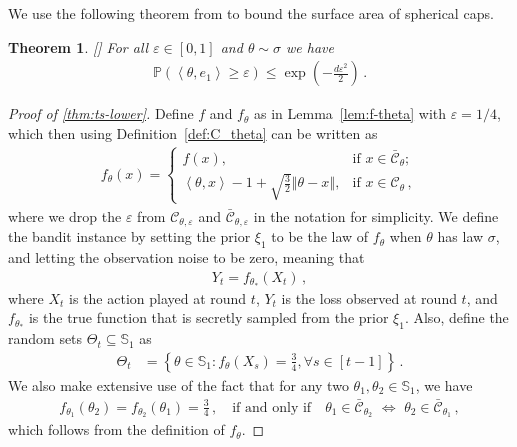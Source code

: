 \documentclass[letter, 12pt]{report}
\newcommand{\todoa}[2][]{\todo[size=\scriptsize,color=green!20!white,#1]{Alr: #2}}
\newcommand{\ip}[1]{\left \langle #1 \right \rangle}
\newcommand{\paren}[1]{\left( #1 \right)}
\newcommand{\norm}[1]{\left \Vert  #1 \right \Vert}
\newcommand{\cC}{\mathcal C}
\newcommand{\bS}{\mathbb S}
\newcommand{\1}{\mathbf{1}}
\newcommand{\mP}{\mathbb{P}}
\renewcommand{\epsilon}{\varepsilon}
\theoremstyle{plain}
\newtheorem{theorem}{Theorem}
\theoremstyle{definition}
\theoremstyle{remark}
\begin{document}
We use the following theorem from \citep{tkocz2018asymptotic} to bound the surface area of spherical caps.
\begin{theorem}\label{thm:spherical-cap}
    [\citealp[Theorem B.1]{tkocz2018asymptotic}]
    For all $\epsilon \in [0,1]$ and $\theta \sim \sigma$ we have
    \begin{align*}
        \mP\paren{
            \ip{\theta, e_1} \geq \epsilon
        }
        \leq
        \exp\paren{-\frac{d\epsilon^2}{2}}\,.
    \end{align*}
\end{theorem}
\begin{proof}[Proof of \cref{thm:ts-lower}]
    Define
    $f$ and $f_\theta$ as in Lemma~\ref{lem:f-theta}
    with $\epsilon = 1/4$,
    which then using Definition~\ref{def:C_theta} can be written as
    \begin{align*}
        f_\theta(x) =
        \begin{cases}
            f(x),                                                 & \text{if } x \in \bar{\cC}_{\theta}; \\
            \ip{\theta, x} - 1 + \sqrt{\frac32}\norm{\theta - x}, & \text{if } x \in \cC_{\theta}\,,
        \end{cases}
    \end{align*}
    where we drop the $\epsilon$ from $\cC_{\theta, \epsilon}$
    and $\bar{\cC}_{\theta, \epsilon}$
    in the notation for simplicity.
    We define the bandit instance by
    setting the prior $\xi_1$ to be the law of $f_\theta$
    when $\theta$ has law $\sigma$,
    and letting the observation noise to be zero, meaning that
    \begin{align*}
        Y_t = f_{\theta_*}(X_t)\,,
    \end{align*}
    where $X_t$ is the action played at round $t$,
    $Y_t$ is the loss observed at round $t$,
    and $f_{\theta_*}$ is the true function
    that is secretly sampled from the prior $\xi_1$.
    Also, define the random sets $\Theta_t \subseteq \bS_1$ as
    \begin{align*}
        \Theta_t & =
        \left\{
        \theta \in \bS_1:
        f_\theta(X_s) = \frac34
        ,
        \forall s \in [t-1]
        \right\}
        \,.
    \end{align*}
    We also make extensive use of the fact that
    for any two $\theta_1, \theta_2 \in \bS_1$, we have
    \begin{align*}
        f_{\theta_1}(\theta_2)
        =
        f_{\theta_2}(\theta_1)
        =
        \frac34\,,
        \quad
        \text{if and only if}
        \quad
        \theta_1 \in \bar{\cC}_{\theta_2}
        \,\,
        \Leftrightarrow
        \,\,
        \theta_2 \in \bar{\cC}_{\theta_1}
        \,,
    \end{align*}
    which follows from the definition of $f_{\theta}$.


\end{proof}
\end{document}
